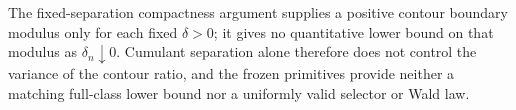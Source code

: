 The fixed-separation compactness argument supplies a positive contour boundary modulus only for each fixed \(\delta>0\); it gives no quantitative lower bound on that modulus as \(\delta_n\downarrow0\). Cumulant separation alone therefore does not control the variance of the contour ratio, and the frozen primitives provide neither a matching full-class lower bound nor a uniformly valid selector or Wald law.